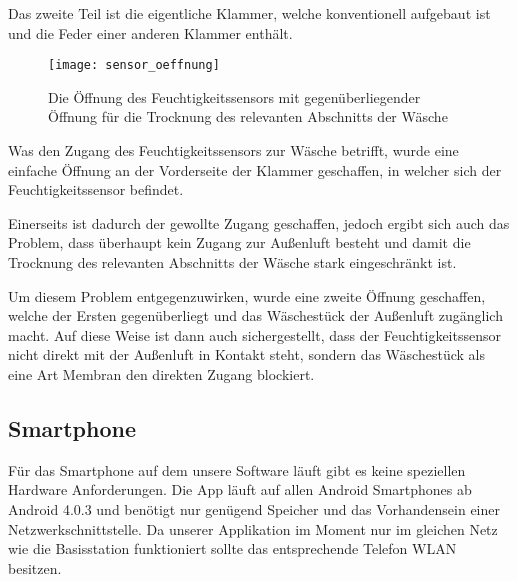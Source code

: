 Das zweite Teil ist die eigentliche Klammer, welche konventionell aufgebaut ist und die Feder einer anderen Klammer enthält.

\begin{figure}[H] 
	\centerline{\texttt{[image: sensor\_oeffnung]}}
	\caption{Die Öffnung des Feuchtigkeitssensors mit gegenüberliegender Öffnung für die Trocknung des relevanten Abschnitts der Wäsche}
	\label{sensor_oeffnung}
\end{figure}

Was den Zugang des Feuchtigkeitssensors zur Wäsche betrifft, wurde eine einfache Öffnung an der Vorderseite der Klammer geschaffen, in welcher sich der Feuchtigkeitssensor befindet.

Einerseits ist dadurch der gewollte Zugang geschaffen, jedoch ergibt sich auch das Problem, dass überhaupt kein Zugang zur Außenluft besteht und damit die Trocknung des relevanten Abschnitts der Wäsche stark eingeschränkt ist.

Um diesem Problem entgegenzuwirken, wurde eine zweite Öffnung geschaffen, welche der Ersten gegenüberliegt und das Wäschestück der Außenluft zugänglich macht. Auf diese Weise ist dann auch sichergestellt, dass der Feuchtigkeitssensor nicht direkt mit der Außenluft in Kontakt steht, sondern das Wäschestück als eine Art Membran den direkten Zugang blockiert.

\newpage
\subsection{Smartphone}
Für das Smartphone auf dem unsere Software läuft gibt es keine speziellen Hardware Anforderungen. Die App läuft auf allen Android Smartphones ab Android 4.0.3 und benötigt nur genügend Speicher und das Vorhandensein einer Netzwerkschnittstelle. Da unserer Applikation im Moment nur im gleichen Netz wie die Basisstation funktioniert sollte das entsprechende Telefon WLAN besitzen.